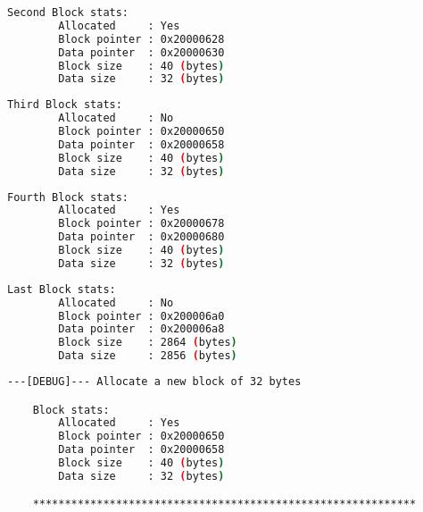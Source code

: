     \begin{outputbox}
    \begin{lstlisting}[language=bash]
    Second Block stats:
        Allocated     : Yes
        Block pointer : 0x20000628
        Data pointer  : 0x20000630
        Block size    : 40 (bytes)
        Data size     : 32 (bytes)
    \end{lstlisting}
    \end{outputbox}

    \begin{outputbox}
    \begin{lstlisting}[language=bash]
    Third Block stats:
        Allocated     : No
        Block pointer : 0x20000650
        Data pointer  : 0x20000658
        Block size    : 40 (bytes)
        Data size     : 32 (bytes)
    \end{lstlisting}
    \end{outputbox}

    \begin{outputbox}
    \begin{lstlisting}[language=bash]
    Fourth Block stats:
        Allocated     : Yes
        Block pointer : 0x20000678
        Data pointer  : 0x20000680
        Block size    : 40 (bytes)
        Data size     : 32 (bytes)
    \end{lstlisting}
    \end{outputbox}

    \begin{outputbox}
    \begin{lstlisting}[language=bash]
    Last Block stats:
        Allocated     : No
        Block pointer : 0x200006a0
        Data pointer  : 0x200006a8
        Block size    : 2864 (bytes)
        Data size     : 2856 (bytes)
    \end{lstlisting}
    \end{outputbox}

    \begin{outputbox}
    \begin{lstlisting}[language=bash]
    ---[DEBUG]--- Allocate a new block of 32 bytes

    Block stats:
        Allocated     : Yes
        Block pointer : 0x20000650
        Data pointer  : 0x20000658
        Block size    : 40 (bytes)
        Data size     : 32 (bytes)

    ************************************************************
    \end{lstlisting}
    \end{outputbox}

